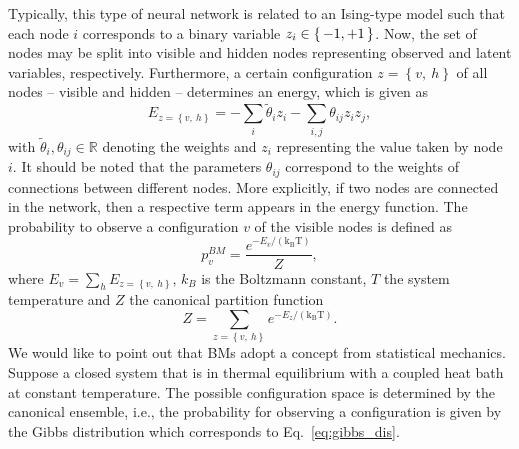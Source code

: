 \documentclass[twocolumn, aps, pra, superscriptaddress, floatfix]{revtex4}
\begin{document}
Typically, this type of neural network is related to an Ising-type model \cite{Ising1925, peierls_1936} such that each node $i$ corresponds to a binary variable $z_i \in \set{-1, +1}$.
Now, the set of nodes may be split into visible and hidden nodes representing observed and latent variables, respectively.
Furthermore, a certain configuration $z=\left\{v,\: h\right\}$ of all nodes -- visible and hidden -- determines an energy, which is given as 
\begin{equation*}
    E_{z = \left\{v,\: h\right\}}= -\sum\limits_i\tilde{\theta}_iz_i - \sum\limits_{i, j}\theta_{ij}z_iz_j,
\end{equation*}
with $\tilde{\theta}_i, \theta_{ij}\in\mathbb{R}$ denoting the weights and $z_i$ representing the value taken by node $i$. It should be noted that the parameters $\theta_{ij}$ correspond to the weights of connections between different nodes. More explicitly, if two nodes are connected in the network, then a respective term appears in the energy function.
The probability to observe a configuration $v$ of the visible nodes is defined as \begin{equation}
\label{eq:gibbs_dis}
    p^{BM}_v = \frac{e^{-E_v/\left(\text{k}_{\text{B}}\text{T}\right)}}{Z},
\end{equation}
where $E_v = \sum_h E_{z = \left\{v,\: h\right\}}$, $k_B$ is the Boltzmann constant, $T$ the system temperature and $Z$ the canonical partition function
\begin{equation*}
    Z=\sum\limits_{z= \left\{v,\: h\right\}}e^{-E_z/\left(\text{k}_{\text{B}}\text{T}\right)}.
\end{equation*}
We would like to point out that BMs adopt a concept from statistical mechanics.
Suppose a closed system that is in thermal equilibrium with a coupled heat bath at constant temperature. The possible configuration space is determined by the canonical ensemble, i.e., the probability for observing a configuration is given by the Gibbs distribution \cite{Boltzmann1877, gibbs02} which corresponds to Eq.~\eqref{eq:gibbs_dis}.
\end{document}
